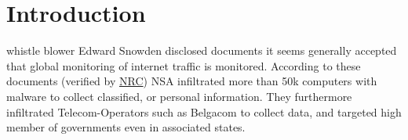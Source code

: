 \documentclass[9pt,journal,compsoc]{IEEEtran}
\begin{document}
\section{Introduction}
%
%



% 
% 
% 
% 
 whistle blower Edward Snowden disclosed documents it seems generally accepted that global monitoring of internet traffic is monitored. According to these documents (verified by \href{http://www.nrc.nl/nieuws/2013/11/23/nederland-sinds-1946-doelwit-van-nsa}{NRC}) NSA infiltrated more than 50k computers with malware to collect classified, or personal information. They furthermore infiltrated Telecom-Operators such as Belgacom to collect data, and targeted high member of governments even in associated states. 
\end{document}
